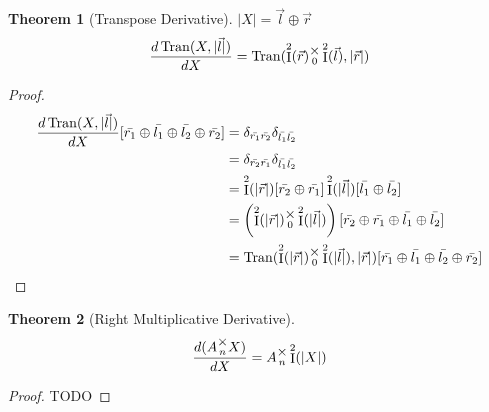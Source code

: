 \documentclass[12pt]{article}
\theoremstyle{definition}
\theoremstyle{plain}
\newtheorem{theorem}{Theorem}[section]
\theoremstyle{ppart}
\DeclareMathOperator{\Ident}{I}
\DeclareMathOperator{\Tran}{Tran}
\newcommand{\mmult}[1]{\text{\raisebox{1ex}{$\underset{#1}{\times}$}}}
\begin{document}
\begin{theorem}[Transpose Derivative]
\label{tran_derivative}
$|X| = \vec{l} \oplus \vec{r}$
\[
 \frac{d\Tran(X, |\vec{l}|)}{dX} =
 \Tran(\Ident^2(\vec{r}) \mmult{0} \Ident^2(\vec{l}), |\vec{r}|)
\]
\end{theorem}
\begin{proof}
\begin{align*}
 \frac{d\Tran(X, |\vec{l}|)}{dX}
 [\bar{r_1} \oplus \bar{l_1} \oplus \bar{l_2} \oplus \bar{r_2}]
 &= \delta_{\bar{r_1}\bar{r_2}} \delta_{\bar{l_1}\bar{l_2}} \\
 &= \delta_{\bar{r_2}\bar{r_1}} \delta_{\bar{l_1}\bar{l_2}} \\
 &=
  \Ident^2(|\vec{r}|)[\bar{r_2}\oplus\bar{r_1}]
  \Ident^2(|\vec{l}|)[\bar{l_1}\oplus\bar{l_2}] \\
 &=
   \left(
    \Ident^2(|\vec{r}|)
    \mmult{0}
    \Ident^2(|\vec{l}|)
  \right)
  [\bar{r_2}\oplus\bar{r_1}\oplus\bar{l_1}\oplus\bar{l_2}] \\
 &=
  \Tran(
    \Ident^2(|\vec{r}|)
    \mmult{0}
    \Ident^2(|\vec{l}|)
  , |\vec{r}|) 
 [\bar{r_1} \oplus \bar{l_1} \oplus \bar{l_2} \oplus \bar{r_2}]
\end{align*}
\end{proof}

\begin{theorem}[Right Multiplicative Derivative]
\label{right_mult_derivative}
\[ \frac{d(A \mmult{n} X)}{dX} = A \mmult{n} \Ident^2(|X|) \]
\end{theorem}
\begin{proof}
TODO
\end{proof}
\end{document}

